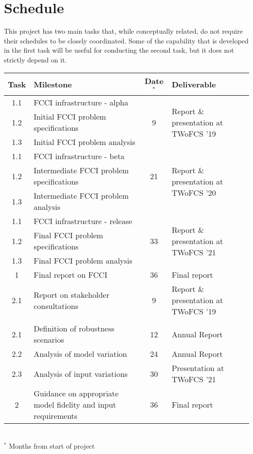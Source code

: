 \section{Schedule}

This project has two main tasks that, while conceptually related, do not
require their schedules to be closely coordinated.  Some of the capability
that is developed in the first task will be useful for conducting the second
task, but it does not strictly depend on it.

\begin{table}[!]
  \begin{center}
    \begin{tabular}{|c|p{}|c|p{}|}\hline\hline
      \textbf{Task} & \textbf{Milestone} & \textbf{Date$^*$} & \textbf{Deliverable} \\\hline\hline
      1.1 & \gls{FCCI} infrastructure - alpha &   & \multirow{3}{0.3\textwidth}{Report \& presentation at TWoFCS '19} \\
      1.2 & Initial \gls{FCCI} problem specifications & 9 & \\
      1.3 & Initial \gls{FCCI} problem analysis &  & \\\hline
      1.1 & \gls{FCCI} infrastructure - beta &   & \multirow{3}{0.3\textwidth}{Report \& presentation at TWoFCS '20} \\
      1.2 & Intermediate \gls{FCCI} problem specifications & 21 & \\
      1.3 & Intermediate \gls{FCCI} problem analysis &  & \\\hline
      1.1 & \gls{FCCI} infrastructure - release &  & \multirow{3}{0.3\textwidth}{Report \& presentation at TWoFCS '21} \\
      1.2 & Final \gls{FCCI} problem specifications & 33 & \\
      1.3 & Final \gls{FCCI} problem analysis &  & \\\hline
      1 & Final report on \gls{FCCI} & 36 & Final report\\
      \hline\hline
      2.1 & Report on stakeholder consultations & 9 & \multirow{1}{0.3\textwidth}{Report \& presentation at TWoFCS '19} \\
          & & &\\
      2.1 & Definition of robustness scenarios & 12 & Annual Report\\
      2.2 & Analysis of model variation & 24 & Annual Report\\
      2.3 & Analysis of input variations & 30 & Presentation at TWoFCS '21\\\hline
      2 & Guidance on appropriate model fidelity and input requirements & 36 & Final report\\
      \hline\hline
    \end{tabular}\\
    $^*$ Months from start of project
  \end{center}
\end{table}


